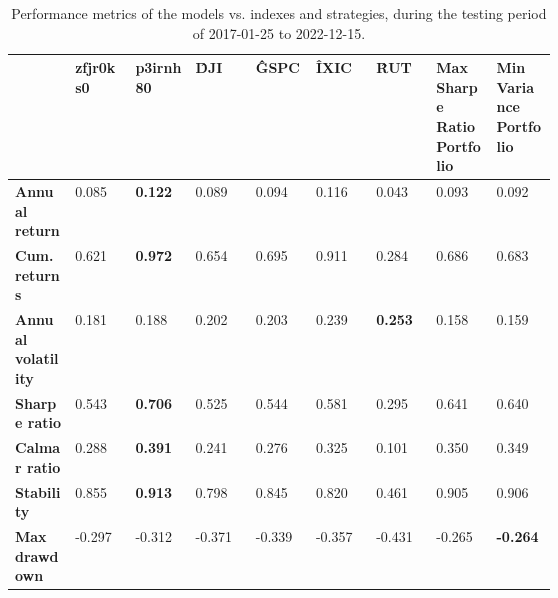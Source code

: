 \begin{table}[ht!]
    \centering
    \caption{Performance metrics of the models vs. indexes and strategies, during the testing period of 2017-01-25 to 2022-12-15.}
    \label{tab:stats}
    {\footnotesize\begin{tabular}{*{9}{|m{0.07\linewidth}|}}
                      \toprule
                      & \bfseries zfjr0ks0 & \bfseries p3irnh80                   & \bfseries \^DJI                       & \bfseries \^GSPC & \bfseries \^IXIC & \bfseries \^RUT & \bfseries Max Sharpe Ratio Portfolio & \bfseries Min Variance Portfolio \\[0.5cm]
                      \midrule
                      \bfseries Annual return       & 0.085              & \color[HTML]{00F000} \bfseries 0.122 & 0.089                                 & 0.094            & 0.116 & 0.043 & 0.093 & 0.092 \\[0.5cm]
                      \bfseries Cum. returns        & 0.621              & \color[HTML]{00F000} \bfseries 0.972 & 0.654                                 & 0.695            & 0.911 & 0.284 & 0.686 & 0.683 \\[0.5cm]
                      \bfseries Annual volatility   & 0.181              & 0.188                                & 0.202                                 & 0.203            & 0.239            & \color[HTML]{00F000} \bfseries 0.253 & 0.158 & 0.159 \\[0.5cm]
                      \bfseries Sharpe ratio        & 0.543              & \color[HTML]{00F000} \bfseries 0.706 & 0.525                                 & 0.544            & 0.581 & 0.295 & 0.641 & 0.640 \\[0.5cm]
                      \bfseries Calmar ratio        & 0.288              & \color[HTML]{00F000} \bfseries 0.391 & 0.241                                 & 0.276            & 0.325 & 0.101 & 0.350 & 0.349 \\[0.5cm]
                      \bfseries Stability           & 0.855              & \color[HTML]{00F000} \bfseries 0.913 & 0.798                                 & 0.845            & 0.820 & 0.461 & 0.905 & 0.906 \\[0.5cm]
                      \bfseries Max drawdown        & -0.297             & -0.312                               & -0.371                                & -0.339           & -0.357           & -0.431                               & -0.265                               & \color[HTML]{00F000} \bfseries -0.264 \\[0.5cm]

\end{tabular}}
\end{table}
